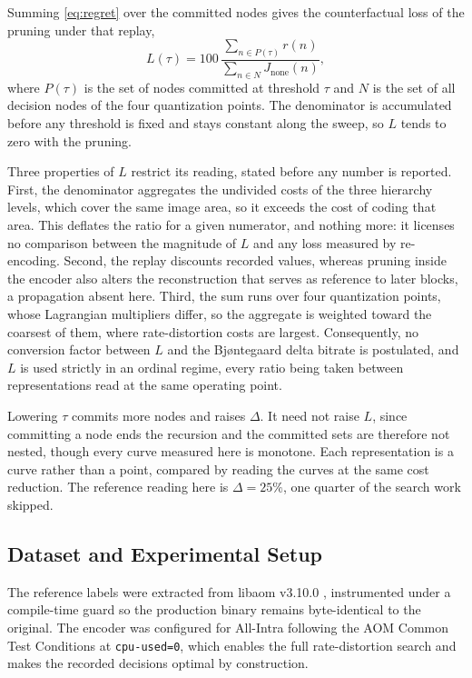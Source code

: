\documentclass{article}
\begin{document}
Summing \eqref{eq:regret} over the committed nodes gives the counterfactual loss
of the pruning under that replay,
\begin{equation}
L(\tau) = 100 \, \frac{\sum_{n \in P(\tau)} r(n)}{\sum_{n \in N}
J_{\mathrm{none}}(n)},
\label{eq:loss}
\end{equation}
where $P(\tau)$ is the set of nodes committed at threshold $\tau$ and $N$ is the
set of all decision nodes of the four quantization points. The denominator is
accumulated before any threshold is fixed and stays constant along the sweep, so
$L$ tends to zero with the pruning.

Three properties of $L$ restrict its reading, stated before any number is
reported. First, the denominator aggregates the undivided costs of
the three hierarchy levels, which cover the same image area, so it exceeds the
cost of coding that area. This deflates the ratio for a given numerator, and
nothing more: it licenses no comparison between the magnitude of $L$ and any loss
measured by re-encoding. Second, the replay discounts recorded values, whereas
pruning inside the encoder also alters the reconstruction that serves as
reference to later blocks, a propagation absent here. Third, the sum runs over
four quantization points, whose Lagrangian multipliers differ, so the aggregate
is weighted toward the coarsest of them, where rate-distortion costs are largest.
Consequently, no conversion factor between $L$ and the Bj\o ntegaard delta
bitrate \cite{bjontegaard} is postulated, and $L$ is used strictly in an ordinal
regime, every ratio being taken between representations read at the same
operating point.

Lowering $\tau$ commits more nodes and raises $\Delta$. It need not raise $L$,
since committing a node ends the recursion and the committed sets are therefore
not nested, though every curve measured here is monotone. Each representation is
a curve rather than a point, compared by reading the curves at the same cost
reduction. The reference reading here is $\Delta = 25\%$, one quarter of the
search work skipped.

\subsection{Dataset and Experimental Setup}
\label{ssec:setup}

The reference labels were extracted from libaom v3.10.0 \cite{libaom},
instrumented under a compile-time guard so the production binary remains
byte-identical to the original. The encoder was configured for All-Intra
following the AOM Common Test Conditions \cite{ctc} at \texttt{cpu-used=0}, which
enables the full rate-distortion search and makes the recorded decisions optimal
by construction.
\end{document}
